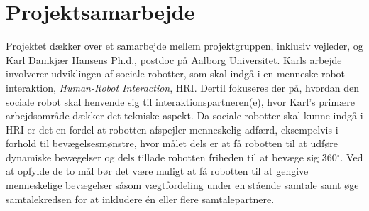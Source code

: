 \section{Projektsamarbejde}
\label{ProjektSamarbejde}
%
Projektet dækker over et samarbejde mellem projektgruppen, inklusiv vejleder, og Karl Damkjær Hansens Ph.d., postdoc på Aalborg Universitet. Karls arbejde involverer udviklingen af sociale robotter, som skal indgå i en menneske-robot interaktion, \textit{Human-Robot Interaction}, HRI. Dertil fokuseres der på, hvordan den sociale robot skal henvende sig til interaktionspartneren(e), hvor Karl's primære arbejdsområde dækker det tekniske aspekt. Da sociale robotter skal kunne indgå i HRI er det en fordel at robotten afspejler menneskelig adfærd, eksempelvis i forhold til bevægelsesmønstre, hvor målet dels er at få robotten til at udføre dynamiske bevægelser og dels tillade robotten friheden til at bevæge sig 360$^{\circ}$. Ved at opfylde de to mål bør det være muligt at få robotten til at gengive menneskelige bevægelser såsom vægtfordeling under en stående samtale samt øge samtalekredsen for at inkludere én eller flere samtalepartnere.

